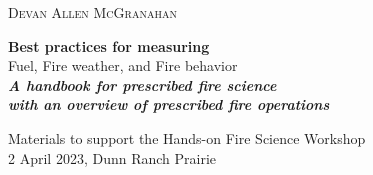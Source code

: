 	\raggedleft %
	
	\vspace*{\baselineskip} %
	
	
	\textsc{{\Large Devan Allen McGranahan}} %
	
	\vspace*{0.167\textheight} %
	
	
	\textbf{\LARGE Best practices for measuring} \\ 
	[\baselineskip] %
	
	{\textcolor{BisonGreen}{\Huge Fuel, Fire weather, and Fire behavior}}\\[\baselineskip] %
	
\textit{\textbf{\LARGE A handbook for prescribed fire science\\with an overview of prescribed fire operations}}\\[\baselineskip] %
\vspace*{1cm} %
	
	{\Large Materials to support the Hands-on Fire Science Workshop \\
	2 April 2023, Dunn Ranch Prairie} 
\vfill
\vspace*{2cm} %

\vfill 

	
	
	{\plogo }%
	
\vspace*{1\baselineskip} %